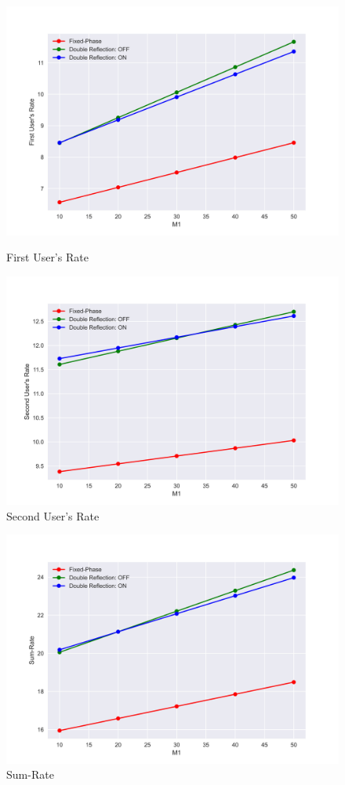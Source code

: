 \documentclass{article}
\begin{document}
\begin{figure}[!h]
	\centering
	\begin{minipage}{.5\textwidth}
		\flushleft
		\includegraphics[width=0.95\linewidth]{With Blockage First User's Rate}
		\caption{First User's Rate}
	\end{minipage}%
	\vline
	\begin{minipage}{.5\textwidth}
		\flushright			
		\includegraphics[width=0.95\linewidth]{With Blockage Second User's Rate}
		\caption{Second User's Rate}
	\end{minipage}
\end{figure}

\begin{figure}[!h]
	\centering
	\includegraphics[width=0.95\linewidth]{With Blockage Sum-Rate}
	\caption{Sum-Rate}
\end{figure}
\end{document}
